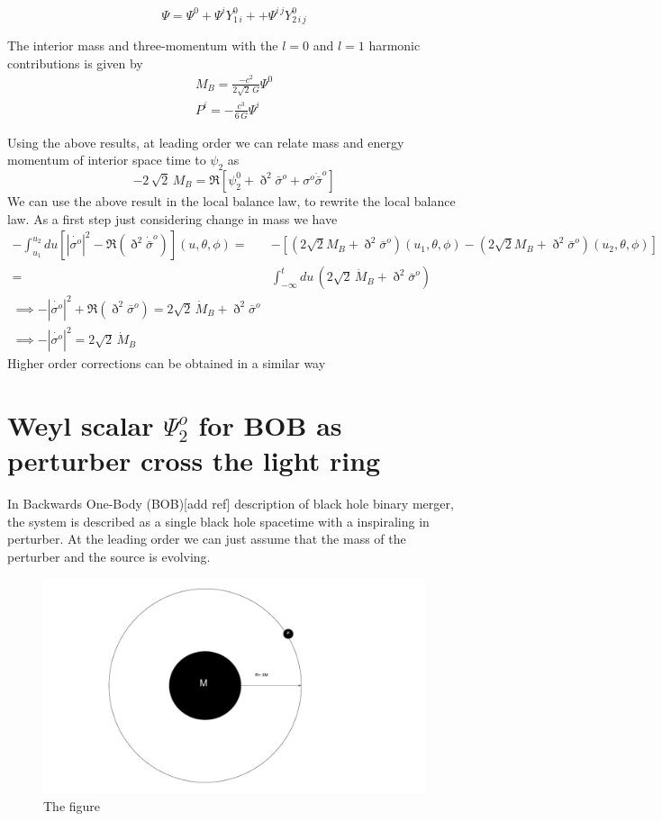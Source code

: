 \documentclass[prd,preprintnumbers,onecolumn,eqsecnum,floatfix,letter]{revtex4}
\begin{document}
\begin{equation}
	\Psi = \Psi^{0} + \Psi^{i}Y^{0}_{1\,i} + + \Psi^{i\,j}Y^{0}_{2\,i\,j}
\end{equation} 

The interior mass and three-momentum with the $l=0$ and $l=1$ harmonic contributions is given by
\begin{align}
	M_{B} = \frac{-c^{2}}{2\sqrt{2}\,G}\Psi^{0}\\
	P^{i} = -\frac{c^3}{6\,G}\Psi^i
\end{align}

Using the above results, at leading order we can relate mass and energy momentum of interior space time to $\psi_2$ as
\begin{equation}
	-2\,\sqrt{2}\,M_B = \Re\left[\psi^{0}_{2} + \eth^{2}\bar{\sigma}^{o} + {\sigma}^{o}\dot{\bar{\sigma}}^{o} \right]
\end{equation}
We can use the above result in the local balance law, to rewrite the local balance law. As a first step just considering change in mass we have
\begin{align}
	 -\int_{u_{1}}^{u_{2}} du \left[|\dot{\sigma^{o}}|^{2} - \Re\left(\eth^{2}\dot{\bar{\sigma}}^{o} \right) \right](u, \theta, \phi) =& -\left[\left(2\sqrt{2}M_B + \eth^{2}\bar{\sigma}^{o}\right)(u_1, \theta, \phi) - \left(2\sqrt{2}M_B + \eth^{2}\bar{\sigma}^{o}\right)(u_2, \theta, \phi)\right]\\ = & \int_{-\infty}^{t} du\, \left(2\sqrt{2}\,\dot{M}_B+ \eth^{2}\bar{\sigma}^{o} \right)\\ \implies -|\dot{\sigma^{o}}|^{2} + \Re\left( \eth^{2}\bar{\sigma}^{o}\right) = 2\sqrt{2}\,\dot{M}_B + \eth^{2}\bar{\sigma}^{o} \\ \implies  -|\dot{\sigma^{o}}|^{2}  = 2\sqrt{2}\,\dot{M}_B  
\end{align}
Higher order corrections can be obtained in a similar way
\section{ Weyl scalar $\Psi^{o}_{2}$ for BOB as perturber cross the light ring }
In Backwards One-Body (BOB)[add ref] description of black hole binary merger, the system is described as a single black hole spacetime with a inspiraling in perturber. At the leading order we can just assume that the mass of the perturber and the source is evolving. 
\begin{figure}
	\includegraphics[width=5.5in]{../plots/BOB.pdf}
	\caption{The figure}
	\label{fig:resedualGrowthLogLog}
\end{figure} 
\end{document}

